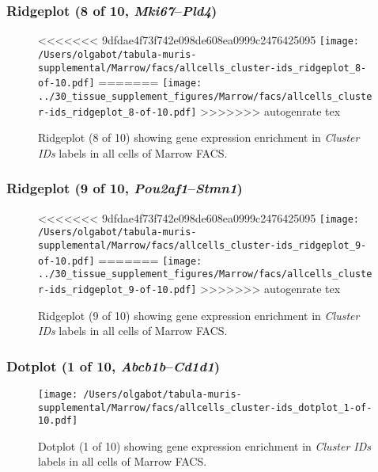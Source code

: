 \clearpage

\subsubsection{Ridgeplot (8 of 10, \emph{Mki67}--\emph{Pld4})}
\begin{figure}[h]
\centering
<<<<<<< 9dfdae4f73f742e098de608ea0999c2476425095
\texttt{[image: /Users/olgabot/tabula-muris-supplemental/Marrow/facs/allcells\_cluster-ids\_ridgeplot\_8-of-10.pdf]}
=======
\texttt{[image: ../30\_tissue\_supplement\_figures/Marrow/facs/allcells\_cluster-ids\_ridgeplot\_8-of-10.pdf]}
>>>>>>> autogenrate tex

\caption{ Ridgeplot (8 of 10)  showing gene expression enrichment in \emph{Cluster IDs} labels in all cells of Marrow FACS. }
\end{figure}


\clearpage

\subsubsection{Ridgeplot (9 of 10, \emph{Pou2af1}--\emph{Stmn1})}
\begin{figure}[h]
\centering
<<<<<<< 9dfdae4f73f742e098de608ea0999c2476425095
\texttt{[image: /Users/olgabot/tabula-muris-supplemental/Marrow/facs/allcells\_cluster-ids\_ridgeplot\_9-of-10.pdf]}
=======
\texttt{[image: ../30\_tissue\_supplement\_figures/Marrow/facs/allcells\_cluster-ids\_ridgeplot\_9-of-10.pdf]}
>>>>>>> autogenrate tex

\caption{ Ridgeplot (9 of 10)  showing gene expression enrichment in \emph{Cluster IDs} labels in all cells of Marrow FACS. }
\end{figure}


\clearpage

\subsubsection{Dotplot (1 of 10, \emph{Abcb1b}--\emph{Cd1d1})}
\begin{figure}[h]
\centering
\texttt{[image: /Users/olgabot/tabula-muris-supplemental/Marrow/facs/allcells\_cluster-ids\_dotplot\_1-of-10.pdf]}

\caption{ Dotplot (1 of 10)  showing gene expression enrichment in \emph{Cluster IDs} labels in all cells of Marrow FACS. }
\end{figure}


